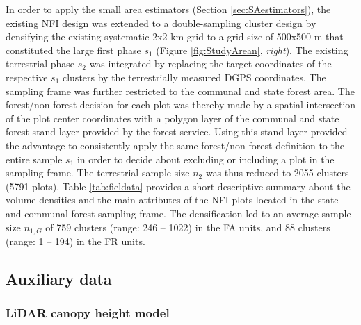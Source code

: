 In order to apply the small area estimators (Section \ref{sec:SAestimators}), the existing NFI design was extended to a double-sampling cluster design by densifying the existing systematic 2x2 km grid to a grid size of 500x500 m that constituted the large first phase $s_1$ (Figure \ref{fig:StudyArean}, \textit{right}). The existing terrestrial phase $s_2$ was integrated by replacing the target coordinates of the respective $s_1$ clusters by the terrestrially measured DGPS coordinates. The sampling frame was further restricted to the communal and state forest area. The forest/non-forest decision for each plot was thereby made by a spatial intersection of the plot center coordinates with a polygon layer of the communal and state forest stand layer provided by the forest service. Using this stand layer provided the advantage to consistently apply the same forest/non-forest definition to the entire sample $s_1$ in order to decide about excluding or including a plot in the sampling frame. The terrestrial sample size $n_2$ was thus reduced to 2055 clusters (5791 plots). Table \ref{tab:fieldata} provides a short descriptive summary about the volume densities and the main attributes of the NFI plots located in the state and communal forest sampling frame. The densification led to an average sample size $n_{1,G}$ of 759  clusters (range: 246 -- 1022) in the FA units, and 88 clusters (range: 1 -- 194) in the FR units.




\subsection{Auxiliary data}
\label{sec:auxinfo}

\subsubsection{LiDAR canopy height model}
\label{sec:chm}

